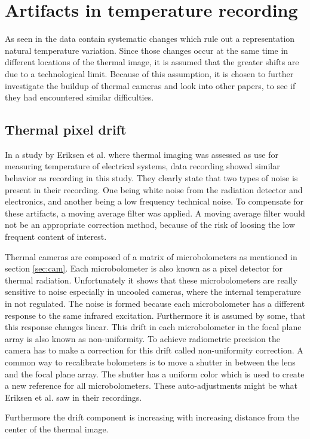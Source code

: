 \section{Artifacts in temperature recording}
\label{sec:artifacts}
As seen in  the data contain systematic changes which rule out a representation natural temperature variation. Since those changes occur at the same time in different locations of the thermal image, it is assumed that the greater shifts are due to a technological limit. Because of this assumption, it is chosen to further investigate the buildup of thermal cameras and look into other papers, to see if they had encountered similar difficulties.

\subsection{Thermal pixel drift}

In a study by Eriksen et al. where thermal imaging was assessed as use for measuring temperature of electrical systems, data recording showed similar behavior as recording in this study. They clearly state that two types of noise is present in their recording. One being white noise from the radiation detector and electronics, and another being a low frequency technical noise. To compensate for these artifacts, a moving average filter was applied.\cite{eriksen2014} A moving average filter would not be an appropriate correction method, because of the risk of loosing the low frequent content of interest. 


Thermal cameras are composed of a matrix of microbolometers as mentioned in section \cref{sec:cam}. Each microbolometer is also known as a pixel detector for thermal radiation.\cite{olbrycht2015,wolf2016} Unfortunately it shows that these microbolometers are really sensitive to noise especially in uncooled cameras, where the internal temperature in not regulated. The noise is formed because each microbolometer has a different response to the same infrared excitation. Furthermore it is assumed by some, that this response changes linear\cite{olbrycht2015}. This drift in each microbolometer in the focal plane array is also known as non-uniformity. To achieve radiometric precision the camera has to make a correction for this drift called non-uniformity correction. A common way to recalibrate bolometers is to move a shutter in between the lens and the focal plane array. The shutter has a uniform color which is used to create a new reference for all microbolometers.\cite{olbrycht2015,wolf2016} These auto-adjustments might be what Eriksen et al. saw in their recordings.

Furthermore the drift component is increasing with increasing distance from the center of the thermal image. 





